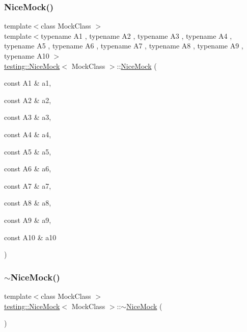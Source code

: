 \subsubsection{\texorpdfstring{NiceMock()}{NiceMock()}\hspace{0.1cm}{\footnotesize\ttfamily [17/17]}}
{\footnotesize\ttfamily template$<$class Mock\+Class $>$ \\
template$<$typename A1 , typename A2 , typename A3 , typename A4 , typename A5 , typename A6 , typename A7 , typename A8 , typename A9 , typename A10 $>$ \\
\mbox{\hyperlink{classtesting_1_1_nice_mock}{testing\+::\+Nice\+Mock}}$<$ Mock\+Class $>$\+::\mbox{\hyperlink{classtesting_1_1_nice_mock}{Nice\+Mock}} (\begin{DoxyParamCaption}\item[{const A1 \&}]{a1,  }\item[{const A2 \&}]{a2,  }\item[{const A3 \&}]{a3,  }\item[{const A4 \&}]{a4,  }\item[{const A5 \&}]{a5,  }\item[{const A6 \&}]{a6,  }\item[{const A7 \&}]{a7,  }\item[{const A8 \&}]{a8,  }\item[{const A9 \&}]{a9,  }\item[{const A10 \&}]{a10 }\end{DoxyParamCaption})\hspace{0.3cm}{\ttfamily [inline]}}

\mbox{\label{classtesting_1_1_nice_mock_a30be5e5e20248f31c8390cd88fa74d7f}} 
\subsubsection{\texorpdfstring{$\sim$NiceMock()}{~NiceMock()}\hspace{0.1cm}{\footnotesize\ttfamily [3/3]}}
{\footnotesize\ttfamily template$<$class Mock\+Class $>$ \\
\mbox{\hyperlink{classtesting_1_1_nice_mock}{testing\+::\+Nice\+Mock}}$<$ Mock\+Class $>$\+::$\sim$\mbox{\hyperlink{classtesting_1_1_nice_mock}{Nice\+Mock}} (\begin{DoxyParamCaption}{ }\end{DoxyParamCaption})\hspace{0.3cm}{\ttfamily [inline]}}



